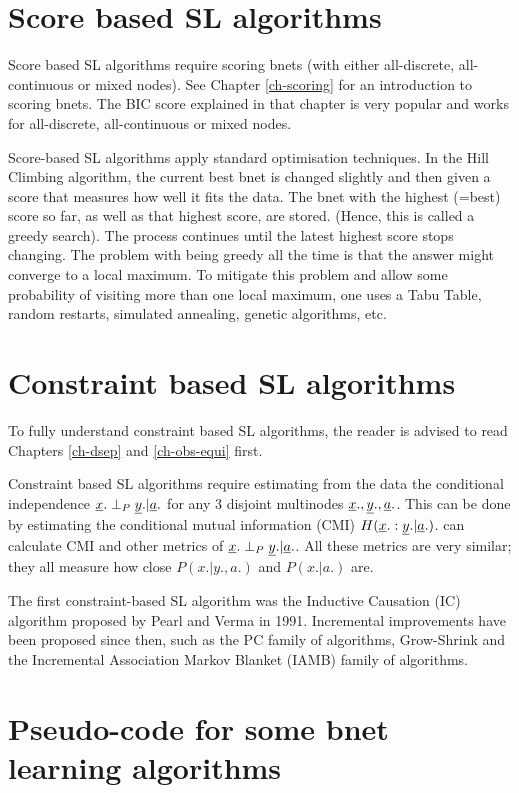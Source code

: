 \section{Score based SL algorithms}

Score based SL algorithms
require
scoring bnets (with either
all-discrete, all-continuous
or mixed nodes).
See Chapter \ref{ch-scoring}
for an introduction
to scoring bnets.
The BIC score
explained
in that chapter is
very popular
and works for all-discrete,
all-continuous or mixed nodes.

Score-based SL algorithms apply
standard
optimisation techniques. 
In the Hill Climbing algorithm,
the current best
bnet is changed
slightly
and then given a score
that measures how well
it fits the data.
The bnet with the highest (=best) 
score so far, as well as that highest score,
are stored. (Hence,
this is called a greedy search).
The process continues
until the latest highest score stops changing.
The problem with being
greedy all the time is that
the answer might
converge to a local maximum.
To mitigate
this problem
and allow some
probability of visiting more
than one
local maximum, one uses a
Tabu Table, random restarts,
simulated annealing, genetic algorithms,
etc.

\section{Constraint based SL algorithms}

To fully understand
 constraint based SL 
algorithms,
the reader 
is advised to read Chapters 
\ref{ch-dsep} and \ref{ch-obs-equi}
first.

Constraint based SL algorithms
require
estimating from the data
the conditional independence
${\underline{x}}.\perp_P {\underline{y}}.|{\underline{a}}.$ 
for any 3 disjoint
multinodes ${\underline{x}}., {\underline{y}}., {\underline{a}}.$.
This can be done by
estimating the conditional
mutual information (CMI)
$H({\underline{x}}.:{\underline{y}}.|{\underline{a}}.)$.
\bnlearn  can calculate CMI and
other metrics
of ${\underline{x}}.\perp_P {\underline{y}}.|{\underline{a}}.$.
All these metrics are very
similar; they 
all measure
how close
$P(x.|y., a.)$
and $P(x.|a.)$ are.

The first
constraint-based SL algorithm
was the Inductive Causation (IC) algorithm
 proposed by Pearl and Verma in 1991.
Incremental
improvements
have been
proposed since then, such as
the PC family
of algorithms,
Grow-Shrink and
the
Incremental Association Markov Blanket (IAMB)
family of algorithms.

\newpage
\section{Pseudo-code 
for some bnet learning algorithms}






